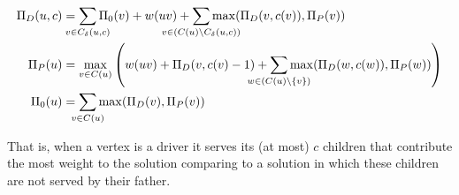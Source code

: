 \begin{align*}
\Md(u, c)	& = \smashoperator{\sum_{v \in C_\delta(u, c)}}{\M0(v) + w(uv)} +
				\smashoperator
				{\sum_{v \in (C(u) \setminus C_\delta(u, c))}}{\max(\Md(v, c(v)),\Mp(v))}
\\
\Mp(u) 		& = \max_{v \in C(u)}{\left(
	w(uv) + \Md(v, c(v) - 1) +
	\smashoperator{\sum_{w \in (C(u) \setminus \{v\})}}{\max(\Md(w, c(w)), \Mp(w))}
\right)}
\\
\M0(u) 		& =  \smashoperator{\sum_{v \in C(u)}}{\max(\Md(v), \Mp(v))}
\end{align*}

That is, when a vertex is a driver it serves its (at most) $c$ children that contribute
the most weight to the solution comparing to a solution in which 
these children are not served by their father.
 

